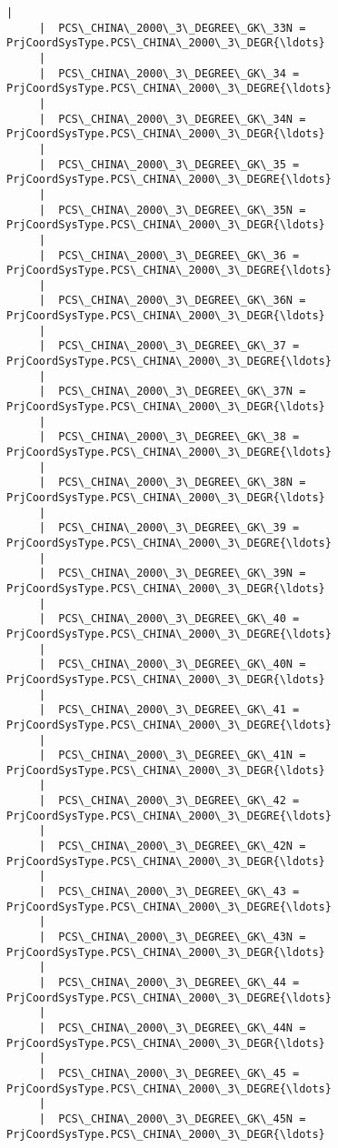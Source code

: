 \documentclass[11pt]{article}
\begin{document}
\begin{Verbatim}[commandchars=\\\{\}]
     |  
     |  PCS\_CHINA\_2000\_3\_DEGREE\_GK\_33N = PrjCoordSysType.PCS\_CHINA\_2000\_3\_DEGR{\ldots}
     |  
     |  PCS\_CHINA\_2000\_3\_DEGREE\_GK\_34 = PrjCoordSysType.PCS\_CHINA\_2000\_3\_DEGRE{\ldots}
     |  
     |  PCS\_CHINA\_2000\_3\_DEGREE\_GK\_34N = PrjCoordSysType.PCS\_CHINA\_2000\_3\_DEGR{\ldots}
     |  
     |  PCS\_CHINA\_2000\_3\_DEGREE\_GK\_35 = PrjCoordSysType.PCS\_CHINA\_2000\_3\_DEGRE{\ldots}
     |  
     |  PCS\_CHINA\_2000\_3\_DEGREE\_GK\_35N = PrjCoordSysType.PCS\_CHINA\_2000\_3\_DEGR{\ldots}
     |  
     |  PCS\_CHINA\_2000\_3\_DEGREE\_GK\_36 = PrjCoordSysType.PCS\_CHINA\_2000\_3\_DEGRE{\ldots}
     |  
     |  PCS\_CHINA\_2000\_3\_DEGREE\_GK\_36N = PrjCoordSysType.PCS\_CHINA\_2000\_3\_DEGR{\ldots}
     |  
     |  PCS\_CHINA\_2000\_3\_DEGREE\_GK\_37 = PrjCoordSysType.PCS\_CHINA\_2000\_3\_DEGRE{\ldots}
     |  
     |  PCS\_CHINA\_2000\_3\_DEGREE\_GK\_37N = PrjCoordSysType.PCS\_CHINA\_2000\_3\_DEGR{\ldots}
     |  
     |  PCS\_CHINA\_2000\_3\_DEGREE\_GK\_38 = PrjCoordSysType.PCS\_CHINA\_2000\_3\_DEGRE{\ldots}
     |  
     |  PCS\_CHINA\_2000\_3\_DEGREE\_GK\_38N = PrjCoordSysType.PCS\_CHINA\_2000\_3\_DEGR{\ldots}
     |  
     |  PCS\_CHINA\_2000\_3\_DEGREE\_GK\_39 = PrjCoordSysType.PCS\_CHINA\_2000\_3\_DEGRE{\ldots}
     |  
     |  PCS\_CHINA\_2000\_3\_DEGREE\_GK\_39N = PrjCoordSysType.PCS\_CHINA\_2000\_3\_DEGR{\ldots}
     |  
     |  PCS\_CHINA\_2000\_3\_DEGREE\_GK\_40 = PrjCoordSysType.PCS\_CHINA\_2000\_3\_DEGRE{\ldots}
     |  
     |  PCS\_CHINA\_2000\_3\_DEGREE\_GK\_40N = PrjCoordSysType.PCS\_CHINA\_2000\_3\_DEGR{\ldots}
     |  
     |  PCS\_CHINA\_2000\_3\_DEGREE\_GK\_41 = PrjCoordSysType.PCS\_CHINA\_2000\_3\_DEGRE{\ldots}
     |  
     |  PCS\_CHINA\_2000\_3\_DEGREE\_GK\_41N = PrjCoordSysType.PCS\_CHINA\_2000\_3\_DEGR{\ldots}
     |  
     |  PCS\_CHINA\_2000\_3\_DEGREE\_GK\_42 = PrjCoordSysType.PCS\_CHINA\_2000\_3\_DEGRE{\ldots}
     |  
     |  PCS\_CHINA\_2000\_3\_DEGREE\_GK\_42N = PrjCoordSysType.PCS\_CHINA\_2000\_3\_DEGR{\ldots}
     |  
     |  PCS\_CHINA\_2000\_3\_DEGREE\_GK\_43 = PrjCoordSysType.PCS\_CHINA\_2000\_3\_DEGRE{\ldots}
     |  
     |  PCS\_CHINA\_2000\_3\_DEGREE\_GK\_43N = PrjCoordSysType.PCS\_CHINA\_2000\_3\_DEGR{\ldots}
     |  
     |  PCS\_CHINA\_2000\_3\_DEGREE\_GK\_44 = PrjCoordSysType.PCS\_CHINA\_2000\_3\_DEGRE{\ldots}
     |  
     |  PCS\_CHINA\_2000\_3\_DEGREE\_GK\_44N = PrjCoordSysType.PCS\_CHINA\_2000\_3\_DEGR{\ldots}
     |  
     |  PCS\_CHINA\_2000\_3\_DEGREE\_GK\_45 = PrjCoordSysType.PCS\_CHINA\_2000\_3\_DEGRE{\ldots}
     |  
     |  PCS\_CHINA\_2000\_3\_DEGREE\_GK\_45N = PrjCoordSysType.PCS\_CHINA\_2000\_3\_DEGR{\ldots}

\end{Verbatim}
\end{document}
